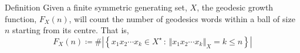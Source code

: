 \documentclass{beamer}
\renewcommand{\leq}{\leqslant}
\begin{document}
\begin{frame}{Definition}
Given a finite symmetric generating set, $X$, the geodesic growth function, $F_X(n)$, will count the number of geodesics words within a ball of size $n$ starting from its centre. That is,
\[
	F_X(n)
	\coloneqq
	\#
	\left\vert
	\left\{
		x_1 x_2 \cdots x_k \in X^\star
		\, : \,
		\left\Vert x_1 x_2 \cdots x_k \right\Vert_X
		=
		k \leq n
	\right\}
	\right\vert
\]

\end{frame}



%
%
\end{document}
